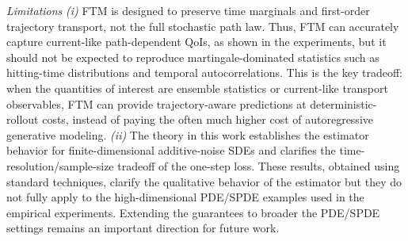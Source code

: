 \documentclass[oneside,11pt]{article}
\theoremstyle{remark}
\begin{document}
\emph{Limitations} \textit{(i)} FTM is designed to preserve time marginals and first-order trajectory transport, not the full stochastic path law. Thus, FTM can accurately capture current-like path-dependent QoIs, as shown in the experiments, but it should not be expected to reproduce martingale-dominated statistics such as hitting-time distributions and temporal autocorrelations. This is the key tradeoff: when the quantities of interest are ensemble statistics or current-like transport observables, FTM can provide trajectory-aware predictions at deterministic-rollout costs, instead of paying the often much higher cost of autoregressive generative modeling. 
\textit{(ii)} The theory in this work establishes the estimator behavior for finite-dimensional additive-noise SDEs and clarifies the time-resolution/sample-size tradeoff of the one-step loss. These results, obtained using standard techniques, clarify the qualitative behavior of the estimator but they do not fully apply to the high-dimensional PDE/SPDE examples used in the empirical experiments. Extending the guarantees to broader the PDE/SPDE settings remains an important direction for future work.
\end{document}
